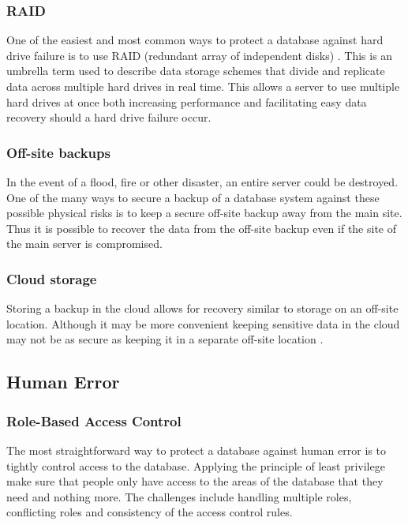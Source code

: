 \documentclass[11pt, twocolumn]{article}
\begin{document}
\subsubsection{RAID}
One of the easiest and most common ways to protect a database against hard drive failure is to use RAID (redundant array of independent disks) \cite{raid}.  This is an umbrella term used to describe data storage schemes that divide and replicate data across multiple hard drives in real time.  This allows a server to use multiple hard drives at once both increasing performance and facilitating easy data recovery should a hard drive failure occur.

\subsubsection{Off-site backups}
In the event of a flood, fire or other disaster, an entire server could be destroyed.  One of the many ways to secure a backup of a database system against these possible physical risks is to keep a secure off-site backup away from the main site.  Thus it is possible to recover the data from the off-site backup even if the site of the main server is compromised.

\subsubsection{Cloud storage}
Storing a backup in the cloud allows for recovery similar to storage on an off-site location.  Although it may be more convenient keeping sensitive data in the cloud may not be as secure as keeping it in a separate off-site location \cite{cloud}.

\subsection{Human Error}
\subsubsection{Role-Based Access Control}
The most straightforward way to protect a database against human error is to tightly control access to the database.  Applying the principle of least privilege make sure that people only have access to the areas of the database that they need and nothing more.  The challenges include handling multiple roles, conflicting roles and consistency of the access control rules.
\end{document}
